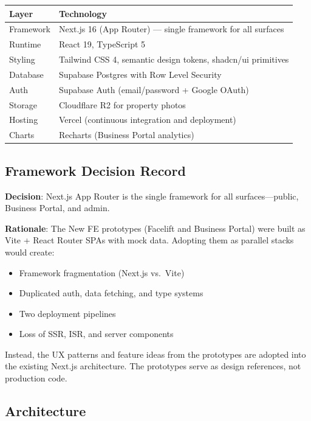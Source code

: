 \documentclass[11pt,letterpaper]{article}
\begin{document}
\begin{tabularx}{\textwidth}{l X}
\toprule
\textbf{Layer} & \textbf{Technology} \\
\midrule
Framework      & Next.js 16 (App Router) --- single framework for all surfaces \\
Runtime        & React 19, TypeScript 5 \\
Styling        & Tailwind CSS 4, semantic design tokens, shadcn/ui primitives \\
Database       & Supabase Postgres with Row Level Security \\
Auth           & Supabase Auth (email/password + Google OAuth) \\
Storage        & Cloudflare R2 for property photos \\
Hosting        & Vercel (continuous integration and deployment) \\
Charts         & Recharts (Business Portal analytics) \\
\bottomrule
\end{tabularx}

\subsection{Framework Decision Record}

\textbf{Decision}: Next.js App Router is the single framework for all surfaces---public, Business Portal, and admin.

\textbf{Rationale}: The New FE prototypes (Facelift and Business Portal) were built as Vite + React Router SPAs with mock data. Adopting them as parallel stacks would create:
\begin{itemize}
    \item Framework fragmentation (Next.js vs.\ Vite)
    \item Duplicated auth, data fetching, and type systems
    \item Two deployment pipelines
    \item Loss of SSR, ISR, and server components
\end{itemize}

Instead, the UX patterns and feature ideas from the prototypes are adopted into the existing Next.js architecture. The prototypes serve as design references, not production code.

\subsection{Architecture}
\end{document}
